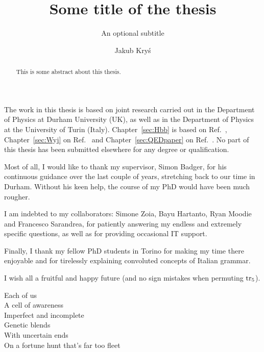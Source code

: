 \documentclass[twoside,frontopenright,halfspacing, openany]{ip3thesis}
\begin{document}
\title{Some title of the thesis}
\subtitle{An optional subtitle}
\author{Jakub Kry\'s}
\maketitlepage*

\begin{abstract}
%
	This is some abstract about this thesis.
%
\end{abstract}

\disableprotrusion
\tableofcontents*
\enableprotrusion

\begin{declaration*}
%
	The work in this thesis is based on joint research carried out in the Department of
	Physics at Durham University (UK), as well as in the Department of Physics at the University of Turin (Italy). Chapter~\ref{sec:Hbb} is based on Ref.~\cite{Badger:2021ega}, Chapter~\ref{sec:Wyj} on Ref.~\cite{Badger:2022ncb} and Chapter~\ref{sec:QEDpaper} on Ref.~\cite{Badger:2023xtl}. No part of this thesis has been submitted elsewhere for any degree or qualification.  
%
\end{declaration*}

\begin{acknowledgements*}
%
	Most of all, I would like to thank my supervisor, Simon Badger, for his continuous guidance over the last couple of years, stretching back to our time in Durham. Without his keen help, the course of my PhD would have been much rougher.
 
    I am indebted to my collaborators: Simone Zoia, Bayu Hartanto, Ryan Moodie and Francesco Sarandrea, for patiently answering my endless and extremely specific questions, as well as for providing occasional IT support.
    
    Finally, I thank my fellow PhD students in Torino for making my time there enjoyable and for tirelessly explaining convoluted concepts of Italian grammar.
    
    I wish all a fruitful and happy future (and no sign mistakes when permuting $\operatorname{\rm tr}_5$).
%
\end{acknowledgements*}

\begin{epigraph*}
%
Each of us\\
A cell of awareness\\
Imperfect and incomplete\\
Genetic blends\\
With uncertain ends\\
On a fortune hunt that's far too fleet
%
\end{epigraph*}
\end{document}
